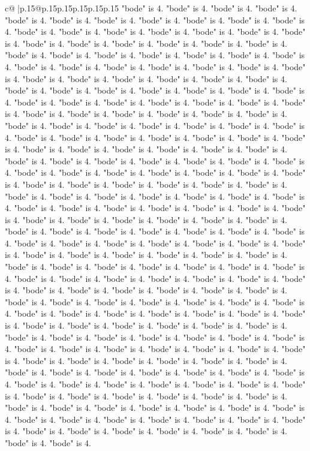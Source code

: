 \documentclass{article}
\begin{document}
{\begin{supertabular}{c@{$\;$}|p{.15\linewidth}@{}p{.15\linewidth}p{.15\linewidth}p{.15\linewidth}p{.15\linewidth}p{.15\linewidth}}
{{{"bode" is 4. "bode" is 4. "bode" is 4. "bode" is 4. "bode" is 4. "bode" is 4. "bode" is 4. "bode" is 4. "bode" is 4. "bode" is 4. "bode" is 4. "bode" is 4. "bode" is 4. "bode" is 4. "bode" is 4. "bode" is 4. "bode" is 4. "bode" is 4. "bode" is 4. "bode" is 4. "bode" is 4. "bode" is 4. "bode" is 4. "bode" is 4. "bode" is 4. "bode" is 4. "bode" is 4. "bode" is 4. "bode" is 4. "bode" is 4. "bode" is 4. "bode" is 4. "bode" is 4. "bode" is 4. "bode" is 4. "bode" is 4. "bode" is 4. "bode" is 4. "bode" is 4. "bode" is 4. "bode" is 4. "bode" is 4. "bode" is 4. "bode" is 4. "bode" is 4. "bode" is 4. "bode" is 4. "bode" is 4. "bode" is 4. "bode" is 4. "bode" is 4. "bode" is 4. "bode" is 4. "bode" is 4. "bode" is 4. "bode" is 4. "bode" is 4. "bode" is 4. "bode" is 4. "bode" is 4. "bode" is 4. "bode" is 4. "bode" is 4. "bode" is 4. "bode" is 4. "bode" is 4. "bode" is 4. "bode" is 4. "bode" is 4. "bode" is 4. "bode" is 4. "bode" is 4. "bode" is 4. "bode" is 4. "bode" is 4. "bode" is 4. "bode" is 4. "bode" is 4. "bode" is 4. "bode" is 4. "bode" is 4. "bode" is 4. "bode" is 4. "bode" is 4. "bode" is 4. "bode" is 4. "bode" is 4. "bode" is 4. "bode" is 4. "bode" is 4. "bode" is 4. "bode" is 4. "bode" is 4. "bode" is 4. "bode" is 4. "bode" is 4. "bode" is 4. "bode" is 4. "bode" is 4. "bode" is 4. "bode" is 4. "bode" is 4. "bode" is 4. "bode" is 4. "bode" is 4. "bode" is 4. "bode" is 4. "bode" is 4. "bode" is 4. "bode" is 4. "bode" is 4. "bode" is 4. "bode" is 4. "bode" is 4. "bode" is 4. "bode" is 4. "bode" is 4. "bode" is 4. "bode" is 4. "bode" is 4. "bode" is 4. "bode" is 4. "bode" is 4. "bode" is 4. "bode" is 4. "bode" is 4. "bode" is 4. "bode" is 4. "bode" is 4. "bode" is 4. "bode" is 4. "bode" is 4. "bode" is 4. "bode" is 4. "bode" is 4. "bode" is 4. "bode" is 4. "bode" is 4. "bode" is 4. "bode" is 4. "bode" is 4. "bode" is 4. "bode" is 4. "bode" is 4. "bode" is 4. "bode" is 4. "bode" is 4. "bode" is 4. "bode" is 4. "bode" is 4. "bode" is 4. "bode" is 4. "bode" is 4. "bode" is 4. "bode" is 4. "bode" is 4. "bode" is 4. "bode" is 4. "bode" is 4. "bode" is 4. "bode" is 4. "bode" is 4. "bode" is 4. "bode" is 4. "bode" is 4. "bode" is 4. "bode" is 4. "bode" is 4. "bode" is 4. "bode" is 4. "bode" is 4. "bode" is 4. "bode" is 4. "bode" is 4. "bode" is 4. "bode" is 4. "bode" is 4. "bode" is 4. "bode" is 4. "bode" is 4. "bode" is 4. "bode" is 4. "bode" is 4. "bode" is 4. "bode" is 4. "bode" is 4. "bode" is 4. "bode" is 4. "bode" is 4. "bode" is 4. "bode" is 4. "bode" is 4. "bode" is 4. "bode" is 4. "bode" is 4. "bode" is 4. "bode" is 4. "bode" is 4. "bode" is 4. "bode" is 4. "bode" is 4. "bode" is 4. "bode" is 4. "bode" is 4. "bode" is 4. "bode" is 4. "bode" is 4. "bode" is 4. "bode" is 4. "bode" is 4. "bode" is 4. "bode" is 4. "bode" is 4. "bode" is 4. "bode" is 4. "bode" is 4. "bode" is 4. "bode" is 4. "bode" is 4. "bode" is 4. "bode" is 4. "bode" is 4. "bode" is 4. "bode" is 4. "bode" is 4. "bode" is 4. "bode" is 4. "bode" is 4. "bode" is 4. "bode" is 4. "bode" is 4. "bode" is 4. "bode" is 4. "bode" is 4. "bode" is 4. "bode" is 4. "bode" is 4. "bode" is 4. "bode" is 4. "bode" is 4. "bode" is 4. "bode" is 4. "bode" is 4. "bode" is 4. "bode" is 4. "bode" is 4. }}}
\end{supertabular}}
\end{document}
